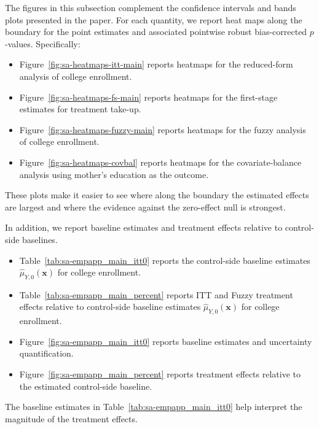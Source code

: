 \documentclass[10pt]{article}
\newcommand{\bx}{\mathbf{x}}
\begin{document}
The figures in this subsection complement the confidence intervals and bands plots presented in the paper. For each quantity, we report heat maps along the boundary for the point estimates and associated pointwise robust bias-corrected $p$-values. Specifically:
\begin{itemize}
    \item Figure~\ref{fig:sa-heatmaps-itt-main} reports heatmaps for the reduced-form analysis of college enrollment.
    \item Figure~\ref{fig:sa-heatmaps-fs-main} reports heatmaps for the first-stage estimates for treatment take-up.
    \item Figure~\ref{fig:sa-heatmaps-fuzzy-main} reports heatmaps for the fuzzy analysis of college enrollment.
    \item Figure~\ref{fig:sa-heatmaps-covbal} reports heatmaps for the covariate-balance analysis using mother's education as the outcome.
\end{itemize}
These plots make it easier to see where along the boundary the estimated effects are largest and where the evidence against the zero-effect null is strongest.

In addition, we report baseline estimates and treatment effects relative to control-side baselines.
\begin{itemize}
    \item Table~\ref{tab:sa-empapp_main_itt0} reports the control-side baseline estimates $\widehat{\mu}_{Y,0}(\bx)$ for college enrollment.
    \item Table~\ref{tab:sa-empapp_main_percent} reports ITT and Fuzzy treatment effects relative to control-side baseline estimates $\widehat{\mu}_{Y,0}(\bx)$ for college enrollment.
    \item Figure~\ref{fig:sa-empapp_main_itt0} reports baseline estimates and uncertainty quantification.
    \item Figure~\ref{fig:sa-empapp_main_percent} reports treatment effects relative to the estimated control-side baseline.
\end{itemize}

The baseline estimates in Table~\ref{tab:sa-empapp_main_itt0} help interpret the magnitude of the treatment effects.

\clearpage
\end{document}
